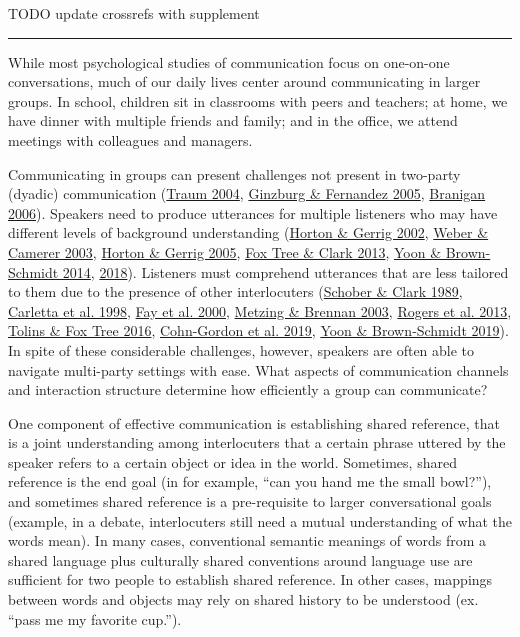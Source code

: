 \documentclass[
  english,
  a4paper,
]{article}
\begin{document}
TODO update crossrefs with supplement

\begin{center}\rule{0.5\linewidth}{0.5pt}\end{center}

While most psychological studies of communication focus on one-on-one conversations, much of our daily lives center around communicating in larger groups. In school, children sit in classrooms with peers and teachers; at home, we have dinner with multiple friends and family; and in the office, we attend meetings with colleagues and managers.

Communicating in groups can present challenges not present in two-party (dyadic) communication (\protect\hyperlink{ref-traum2004}{Traum 2004}, \protect\hyperlink{ref-ginzburg2005}{Ginzburg \& Fernandez 2005}, \protect\hyperlink{ref-branigan2006}{Branigan 2006}). Speakers need to produce utterances for multiple listeners who may have different levels of background understanding (\protect\hyperlink{ref-horton2002}{Horton \& Gerrig 2002}, \protect\hyperlink{ref-weber2003}{Weber \& Camerer 2003}, \protect\hyperlink{ref-horton2005}{Horton \& Gerrig 2005}, \protect\hyperlink{ref-fox-tree2013}{Fox Tree \& Clark 2013}, \protect\hyperlink{ref-yoon2014}{Yoon \& Brown-Schmidt 2014}, \protect\hyperlink{ref-yoon2018}{2018}). Listeners must comprehend utterances that are less tailored to them due to the presence of other interlocuters (\protect\hyperlink{ref-schober1989}{Schober \& Clark 1989}, \protect\hyperlink{ref-carletta1998}{Carletta et al. 1998}, \protect\hyperlink{ref-fay2000}{Fay et al. 2000}, \protect\hyperlink{ref-metzing2003}{Metzing \& Brennan 2003}, \protect\hyperlink{ref-rogers2013}{Rogers et al. 2013}, \protect\hyperlink{ref-tolins2016}{Tolins \& Fox Tree 2016}, \protect\hyperlink{ref-cohngordon}{Cohn-Gordon et al. 2019}, \protect\hyperlink{ref-yoon2019}{Yoon \& Brown‐Schmidt 2019}). In spite of these considerable challenges, however, speakers are often able to navigate multi-party settings with ease. What aspects of communication channels and interaction structure determine how efficiently a group can communicate?

One component of effective communication is establishing shared reference, that is a joint understanding among interlocuters that a certain phrase uttered by the speaker refers to a certain object or idea in the world. Sometimes, shared reference is the end goal (in for example, ``can you hand me the small bowl?''), and sometimes shared reference is a pre-requisite to larger conversational goals (example, in a debate, interlocuters still need a mutual understanding of what the words mean). In many cases, conventional semantic meanings of words from a shared language plus culturally shared conventions around language use are sufficient for two people to establish shared reference. In other cases, mappings between words and objects may rely on shared history to be understood (ex. ``pass me my favorite cup.'').
\end{document}

